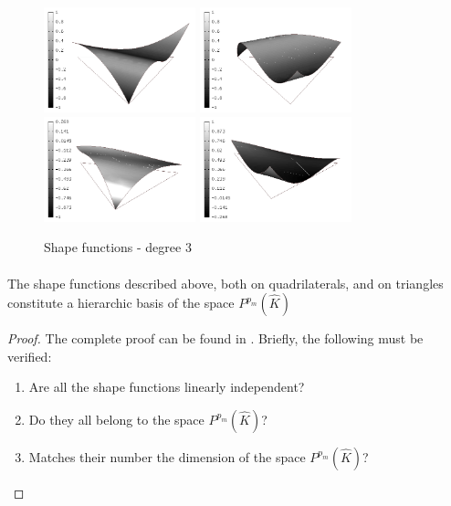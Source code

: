 \begin{figure}[H]
\begin{center}
\includegraphics[width=4.4cm]{minor_examples/BasisFunctions023}
\includegraphics[width=4.4cm]{minor_examples/BasisFunctions022}
\\
\includegraphics[width=4.4cm]{minor_examples/BasisFunctions025}
\includegraphics[width=4.4cm]{minor_examples/BasisFunctions026}
\end{center}
\caption{Shape functions - degree 3}
\vspace{-7mm}
\label{bubbleshape3t}
\end{figure}

\paragraph{}
\begin{proposition}
The shape functions described above, both on quadrilaterals, and on triangles constitute
a hierarchic basis of the space $P^{p_m}(\hat{K})$
\end{proposition}
\begin{proof}
The complete proof can be found in \cite{solin1}. Briefly, the following 
must be verified:
\vspace{-2ex}
\begin{enumerate}
\parskip=0pt %
\item Are all the shape functions linearly independent?
\item Do they all belong to the space $P^{p_m}(\hat{K})$?
\item Matches their number the dimension of the space $P^{p_m}(\hat{K})$?
\end{enumerate}
\end{proof}

